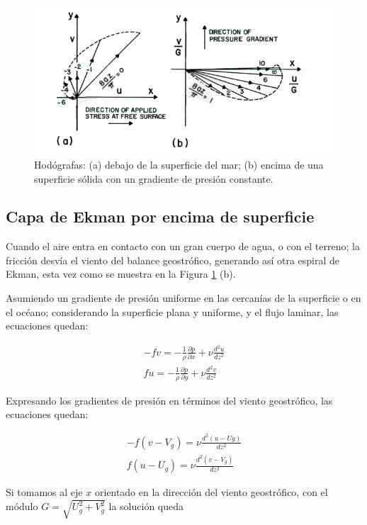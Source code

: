 \documentclass[openany]{book}
\begin{document}
\begin{figure}[htbp]
    \centering
    \includegraphics[width=\linewidth]{img/ekman-HS.png} 
    \caption{Hodógrafas: (a) debajo de la superficie del mar; (b)
    encima de una superficie sólida con un gradiente de presión
    constante.}
    \label{fig:ekman}
\end{figure}

\subsection{Capa de Ekman por encima de superficie}
Cuando el aire entra en contacto con un gran cuerpo de agua, o con el
terreno; la fricción desvía el viento del balance geostrófico,
generando así otra espiral de Ekman, esta vez como se muestra en la
Figura \ref{fig:ekman} (b).
\par Asumiendo un gradiente de presión uniforme en las cercanías de
la superficie o en el océano; considerando la superficie plana y
uniforme, y el flujo laminar, las ecuaciones quedan:

\begin{gather}
    -fv=-\frac{1}{\rho}\frac{\partial p}{\partial x}+\nu \frac{d^2u}{dz^2}\\
    fu=-\frac{1}{\rho}\frac{\partial p}{\partial y}+\nu \frac{d^2v}{dz^2}
\end{gather}

\par Expresando los gradientes de presión en términos del viento
geostrófico, las ecuaciones quedan:

\begin{gather}
    -f(v-V_{g})=\nu\frac{d^2(u-U{g})}{dz^2}\\
    f(u-U_{g})=\nu\frac{d^2(v-V_{g})}{dz^2}
\end{gather}

\par Si tomamos al eje $x$ orientado en la dirección del viento
geostrófico, con el módulo $G=\sqrt{U_{g}^2+V_{g}^2}$ la solución 
queda
\end{document}
